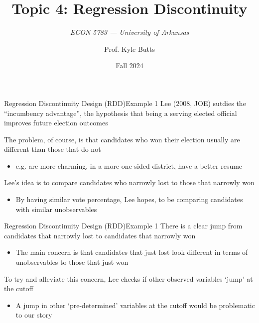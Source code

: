 \documentclass[aspectratio=169,t,11pt,table]{beamer}
\title{Topic 4: Regression Discontinuity}
\subtitle{\it  ECON 5783 — University of Arkansas}
\date{Fall 2024}
\author{Prof. Kyle Butts}
\begin{document}
\begin{frame}
\maketitle

\end{frame}

\begin{frame}{Regression Discontinuity Design (RDD)}{Example 1}
  Lee (2008, JOE) sutdies the ``incumbency advantage'', the hypothesis that being a serving elected official improves future election outcomes

  \pause
  \bigskip
  The problem, of course, is that candidates who won their election usually are different than those that do not 
  \begin{itemize}
    \item e.g. are more charming, in a more one-sided district, have a better resume
  \end{itemize}

  \pause
  \bigskip
  Lee's idea is to compare candidates who narrowly lost to those that narrowly won 
  \begin{itemize}
    \item By having similar vote percentage, Lee hopes, to be comparing candidates with similar unobservables
  \end{itemize}
\end{frame}


\begin{frame}{Regression Discontinuity Design (RDD)}{Example 1}
  There is a clear jump from candidates that narrowly lost to candidates that narrowly won
  \begin{itemize}
    \item The main concern is that candidates that just lost look different in terms of unobservables to those that just won
  \end{itemize}

  \pause
  \bigskip
  To try and alleviate this concern, Lee checks if other observed variables `jump' at the cutoff 
  \begin{itemize}
    \item A jump in other `pre-determined' variables at the cutoff would be problematic to our story
  \end{itemize}
\end{frame}
\end{document}
